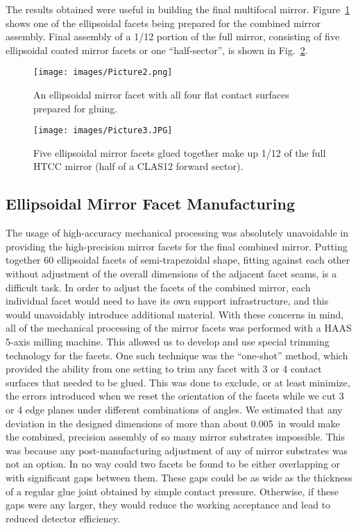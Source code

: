 The results obtained were useful in building the final multifocal mirror. Figure~\ref{fig:facet} shows one of the
ellipsoidal facets being prepared for the combined mirror assembly. Final assembly of a 1/12 portion of the full
mirror, consisting of five ellipsoidal coated mirror facets or one ``half-sector'', is shown in
Fig.~\ref{fig:Picture3}.

\begin{figure}[ht]
    \centering
    \texttt{[image: images/Picture2.png]}
    \caption{An ellipsoidal mirror facet with all four flat contact surfaces prepared for gluing.}
    \label{fig:facet}
\end{figure}
\begin{figure}[ht]
    \centering
    \texttt{[image: images/Picture3.JPG]}
    \caption{Five ellipsoidal mirror facets glued together make up 1/12 of the full HTCC mirror (half of a CLAS12
      forward sector).}
    \label{fig:Picture3}
\end{figure}

\subsection {Ellipsoidal Mirror Facet Manufacturing}

The usage of high-accuracy mechanical processing was absolutely unavoidable in providing the high-precision
mirror facets for the final combined mirror. Putting together 60 ellipsoidal facets of semi-trapezoidal shape,
fitting against each other without adjustment of the overall dimensions of the adjacent facet seams, is a
difficult task. In order to adjust the facets of the combined mirror, each individual facet would need to have
its own support infrastructure, and this would unavoidably introduce additional material. With these concerns in
mind, all of the mechanical processing of the mirror facets was performed with a HAAS 5-axis milling machine.
This allowed us to develop and use special trimming technology for the facets. One such technique was the
``one-shot'' method, which provided the ability from one setting to trim any facet with 3 or 4 contact surfaces
that needed to be glued. This was done to exclude, or at least minimize, the errors introduced when we reset the
orientation of the facets while we cut 3 or 4 edge planes under different combinations of angles. We estimated
that any deviation in the designed dimensions of more than about 0.005~in would make the combined, precision
assembly of so many mirror substrates impossible. This was because any post-manufacturing adjustment of any
of mirror substrates was not an option. In no way could two facets be found to be either overlapping or with
significant gaps between them. These gaps could be as wide as the thickness of a regular glue joint obtained by
simple contact pressure. Otherwise, if these gaps were any larger, they would reduce the working acceptance
and lead to reduced detector efficiency.

